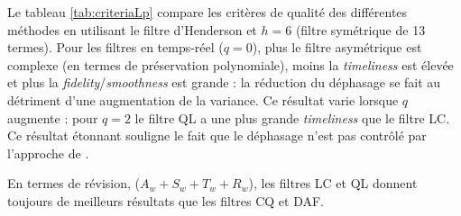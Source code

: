 \documentclass[
  11pt,
  french,
  a4paper]{article}
\newcommand\1{\mathds{1}}
\begin{document}
Le tableau \ref{tab:criteriaLp} compare les critères de qualité des différentes méthodes en utilisant le filtre d'Henderson et \(h=6\) (filtre symétrique de 13 termes).
Pour les filtres en temps-réel (\(q=0\)), plus le filtre asymétrique est complexe (en termes de préservation polynomiale), moins la \emph{timeliness} est élevée et plus la \emph{fidelity}/\emph{smoothness} est grande : la réduction du déphasage se fait au détriment d'une augmentation de la variance.
Ce résultat varie lorsque \(q\) augmente : pour \(q=2\) le filtre QL a une plus grande \emph{timeliness} que le filtre LC.
Ce résultat étonnant souligne le fait que le déphasage n'est pas contrôlé par l'approche de \textcite{proietti2008}.

En termes de révision, (\(A_w+S_w+T_w+R_w\)), les filtres LC et QL donnent toujours de meilleurs résultats que les filtres CQ et DAF.
\end{document}
